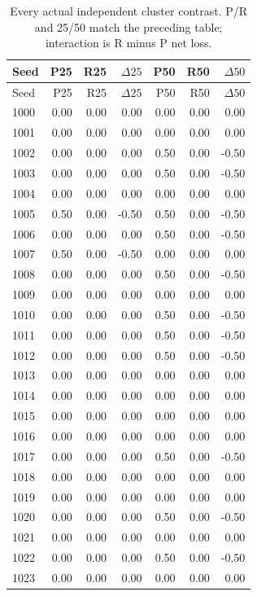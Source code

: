 \documentclass[10pt,letterpaper]{article}
\begin{document}
{\small
\begin{longtable}{lrrrrrr}
\caption{Every actual independent cluster contrast. P/R and 25/50 match the preceding table; interaction is R minus P net loss.}\\
\toprule
Seed & P25 & R25 & $\Delta25$ & P50 & R50 & $\Delta50$\\
\midrule\endfirsthead
\toprule
Seed & P25 & R25 & $\Delta25$ & P50 & R50 & $\Delta50$\\
\midrule\endhead
1000 & 0.00 & 0.00 & 0.00 & 0.00 & 0.00 & 0.00\\
1001 & 0.00 & 0.00 & 0.00 & 0.00 & 0.00 & 0.00\\
1002 & 0.00 & 0.00 & 0.00 & 0.50 & 0.00 & -0.50\\
1003 & 0.00 & 0.00 & 0.00 & 0.50 & 0.00 & -0.50\\
1004 & 0.00 & 0.00 & 0.00 & 0.00 & 0.00 & 0.00\\
1005 & 0.50 & 0.00 & -0.50 & 0.50 & 0.00 & -0.50\\
1006 & 0.00 & 0.00 & 0.00 & 0.50 & 0.00 & -0.50\\
1007 & 0.50 & 0.00 & -0.50 & 0.00 & 0.00 & 0.00\\
1008 & 0.00 & 0.00 & 0.00 & 0.50 & 0.00 & -0.50\\
1009 & 0.00 & 0.00 & 0.00 & 0.00 & 0.00 & 0.00\\
1010 & 0.00 & 0.00 & 0.00 & 0.50 & 0.00 & -0.50\\
1011 & 0.00 & 0.00 & 0.00 & 0.50 & 0.00 & -0.50\\
1012 & 0.00 & 0.00 & 0.00 & 0.50 & 0.00 & -0.50\\
1013 & 0.00 & 0.00 & 0.00 & 0.00 & 0.00 & 0.00\\
1014 & 0.00 & 0.00 & 0.00 & 0.00 & 0.00 & 0.00\\
1015 & 0.00 & 0.00 & 0.00 & 0.00 & 0.00 & 0.00\\
1016 & 0.00 & 0.00 & 0.00 & 0.00 & 0.00 & 0.00\\
1017 & 0.00 & 0.00 & 0.00 & 0.50 & 0.00 & -0.50\\
1018 & 0.00 & 0.00 & 0.00 & 0.00 & 0.00 & 0.00\\
1019 & 0.00 & 0.00 & 0.00 & 0.00 & 0.00 & 0.00\\
1020 & 0.00 & 0.00 & 0.00 & 0.50 & 0.00 & -0.50\\
1021 & 0.00 & 0.00 & 0.00 & 0.00 & 0.00 & 0.00\\
1022 & 0.00 & 0.00 & 0.00 & 0.50 & 0.00 & -0.50\\
1023 & 0.00 & 0.00 & 0.00 & 0.00 & 0.00 & 0.00\\
\bottomrule
\end{longtable}
}
\end{document}
